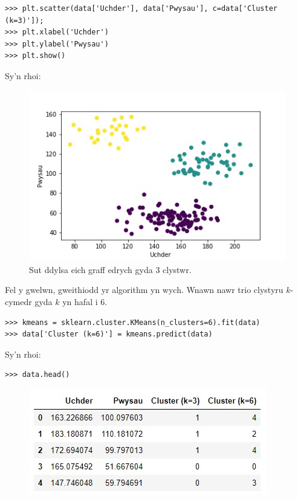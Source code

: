 \begin{verbatim}
>>> plt.scatter(data['Uchder'], data['Pwysau'], c=data['Cluster (k=3)']);
>>> plt.xlabel('Uchder')
>>> plt.ylabel('Pwysau')
>>> plt.show()
\end{verbatim}

Sy'n rhoi:

\begin{figure}[H]
\begin{center}
\includegraphics[width=0.7\linewidth]{../img/3clystwrpython.jpeg}
\caption{Sut ddylsa eich graff edrych gyda 3 clystwr.}
\label{fig:3clystwrpython}
\end{center}
\end{figure}

Fel y gwelwn, gweithiodd yr algorithm yn wych. Wnawn nawr trio clystyru $k$-cymedr gyda $k$ yn hafal i 6.

\begin{verbatim}
>>> kmeans = sklearn.cluster.KMeans(n_clusters=6).fit(data)
>>> data['Cluster (k=6)'] = kmeans.predict(data)
\end{verbatim}

Sy'n rhoi:

\begin{verbatim}
>>> data.head()
\end{verbatim}

\begin{figure}[H]
\begin{center}
\includegraphics[width=0.35\linewidth]{../img/tabl3.jpg}
\end{center}
\label{fig:Data3}
\end{figure}

